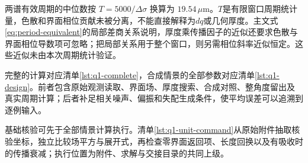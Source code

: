 两谱有效周期的中位数按 $T=5000/\Delta\sigma$ 换算为 $19.54\,\mu\mathrm{m}$。$T$是有限窗口周期统计量，色散和界面相位贡献未被分离，不能直接解释为$dq$或几何厚度。主文式\eqref{eq:period-equivalent}的局部差商关系说明，厚度乘传播因子的近似还要求色散与界面相位导数项可忽略；把局部关系用于整个窗口，则另需相位斜率近似恒定。这些近似未由本次周期统计验证。

完整的计算对应清单\ref{lst:q1-complete}，合成情景的全部参数对应清单\ref{lst:q1-design}。前者包含原始观测读取、界面场、厚度搜索、合成对照、整角度留出及真实周期计算；后者补足相关噪声、偏振和失配生成条件，使平均误差可以追溯到逐例输入。

\begingroup
\renewcommand{\lstlistingname}{清单}



\endgroup

基础核验可先于全部情景计算执行。清单\ref{lst:q1-unit-command}从原始附件抽取核验坐标，独立比较场平方与展开式，再检查零界面返回项、长度回换以及有吸收时的传播衰减；执行位置为附件、求解与交接目录的共同上级。

